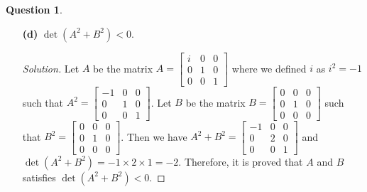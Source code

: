 \documentclass{article}
\newcommand{\lp}{\left(}
\newcommand{\rp}{\right)}
\theoremstyle{definition}
\newtheorem{question}{Question}
\begin{document}
\begin{question}
\begin{enumerate}
\vspace{.25cm}

\item[\textbf{(d)}] $\det\lp A^2+B^2\rp < 0$.

\begin{proof}[Solution]
    Let \(A\) be the matrix \(A=
    \begin{bmatrix}
        i & 0 & 0 \\
        0 & 1 & 0 \\
        0 & 0 & 1
    \end{bmatrix}\) where we defined \(i\) as \(i^2=-1\)
    such that \(A^2=
    \begin{bmatrix}
        -1 & 0 & 0 \\
        0 & 1 & 0 \\
        0 & 0 & 1
    \end{bmatrix}\).
    Let \(B\) be the matrix \(B=
    \begin{bmatrix}
        0 & 0 & 0 \\
        0 & 1 & 0 \\
        0 & 0 & 0
    \end{bmatrix}\) such that \(B^2=
    \begin{bmatrix}
        0 & 0 & 0 \\
        0 & 1 & 0 \\
        0 & 0 & 0
    \end{bmatrix}\). Then we have \(A^2+B^2=
    \begin{bmatrix}
        -1 & 0 & 0 \\
        0 & 2 & 0 \\
        0 & 0 & 1
    \end{bmatrix}\) and \(\det(A^2+B^2)=-1\times2\times1=-2\).
    Therefore, it is proved that \(A\) and \(B\) satisfies \(\det(A^2+B^2)<0\).
\end{proof}

\end{enumerate}

\end{question}






\vspace{.75cm}

\label{Question 3}


\end{document}
